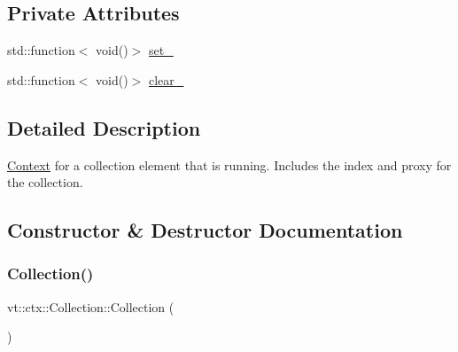 \subsection*{Private Attributes}
\begin{DoxyCompactItemize}
\item 
std\+::function$<$ void()$>$ \hyperlink{structvt_1_1ctx_1_1_collection_a0a8366979772c939b109323587154940}{set\+\_\+}
\item 
std\+::function$<$ void()$>$ \hyperlink{structvt_1_1ctx_1_1_collection_a300d6fb22980dbd23b0cdb8737dc25be}{clear\+\_\+}
\end{DoxyCompactItemize}


\subsection{Detailed Description}
\hyperlink{structvt_1_1ctx_1_1_context}{Context} for a collection element that is running. Includes the index and proxy for the collection. 

\subsection{Constructor \& Destructor Documentation}
\mbox{\label{structvt_1_1ctx_1_1_collection_a19c7871680086e92be70f24d58bb0321}} 
\subsubsection{\texorpdfstring{Collection()}{Collection()}\hspace{0.1cm}{\footnotesize\ttfamily [1/2]}}
{\footnotesize\ttfamily vt\+::ctx\+::\+Collection\+::\+Collection (\begin{DoxyParamCaption}{ }\end{DoxyParamCaption})\hspace{0.3cm}{\ttfamily [default]}}

\mbox{\label{structvt_1_1ctx_1_1_collection_a461f8690260111c0dd2f21bd1b3acf6c}} 
